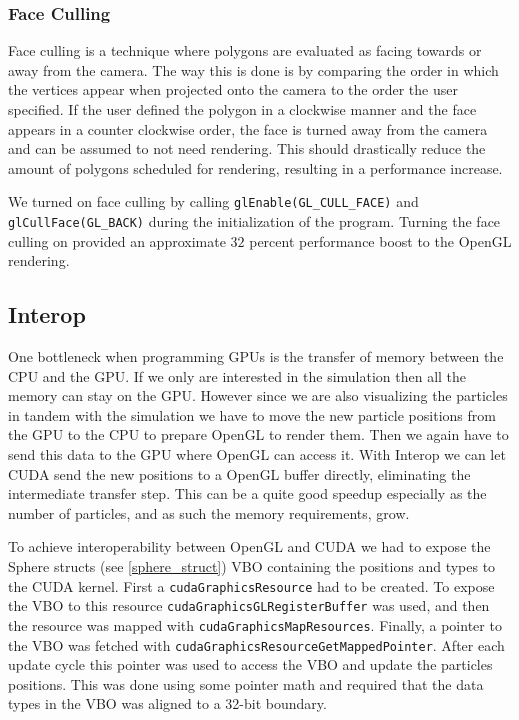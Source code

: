 \documentclass[a4paper]{article}
\begin{document}
\subsubsection{Face Culling}
Face culling is a technique where polygons are evaluated as facing towards or away from the camera. The way this is done is by comparing the order in which the vertices appear when projected onto the camera to the order the user specified. If the user defined the polygon in a clockwise manner and the face appears in a counter clockwise order, the face is turned away from the camera and can be assumed to not need rendering. This should drastically reduce the amount of polygons scheduled for rendering, resulting in a performance increase.

We turned on face culling by calling \verb|glEnable(GL_CULL_FACE)| and \verb|glCullFace(GL_BACK)| during the initialization of the program. 
Turning the face culling on provided an approximate $32$ percent performance boost to the OpenGL rendering.

  

\subsection{Interop}

One bottleneck when programming GPUs is the transfer of memory between the CPU and the GPU. 
If we only are interested in the simulation then all the memory can stay on the GPU. 
However since we are also visualizing the particles in tandem with the simulation we have to move the new particle positions from the GPU to the CPU to prepare OpenGL to render them. 
Then we again have to send this data to the GPU where OpenGL can access it. 
With Interop we can let CUDA send the new positions to a OpenGL buffer directly, eliminating the intermediate transfer step. 
This can be a quite good speedup especially as the number of particles, and as such the memory requirements, grow. 

To achieve interoperability between OpenGL and CUDA we had to expose the Sphere structs (see \ref{sphere_struct}) VBO containing the positions and types to the CUDA kernel. 
First a \verb|cudaGraphicsResource| had to be created. 
To expose the VBO to this resource \verb|cudaGraphicsGLRegisterBuffer| was used, and then the resource was mapped with \verb|cudaGraphicsMapResources|. 
Finally, a pointer to the VBO was fetched with \verb|cudaGraphicsResourceGetMappedPointer|. 
After each update cycle this pointer was used to access the VBO and update the particles positions. 
This was done using some pointer math and required that the data types in the VBO was aligned to a 32-bit boundary. 
\end{document}
